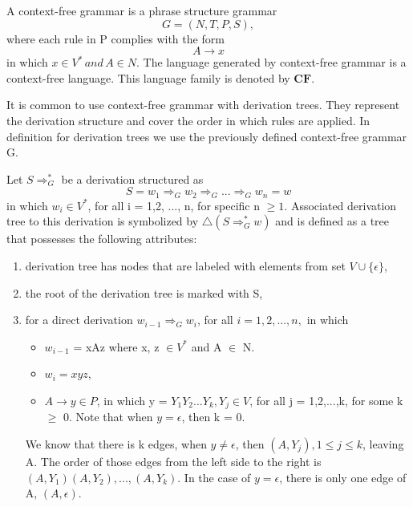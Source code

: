 \begin{definition}
\label{Def17}
A context-free grammar is a phrase structure grammar $$ G = (N, T, P, S),$$ where each rule in P complies with the form
$$A \rightarrow x$$ in which $x \in V^* \, and \, A \in N$. The language generated by context-free grammar is a context-free language. This language family is denoted by \(\mathbf{CF}\).
\end{definition}

It is common to use context-free grammar with derivation trees. They represent the derivation structure and cover the order in which rules are applied. In definition for derivation trees we use the previously defined context-free grammar G.

\begin{definition}
\label{derivtree}
Let $S \Rightarrow^*_G$ be a derivation structured as $$S = w_1 \Rightarrow_G w_2 \Rightarrow_G ... \Rightarrow_G w_n = w$$ in which $w_i \in V^*$, for all i = 1,2, ..., n, for specific n $\geq 1$. Associated derivation tree to this derivation is symbolized by $\triangle (S \Rightarrow^*_G w)$ and is defined as a tree that possesses the following attributes:

\begin{enumerate}
    \item derivation tree has nodes that are labeled with elements from set $ V \cup \{\epsilon\}$,
    \item the root of the derivation tree is marked with S,
    \item {for a direct derivation $w_{i-1} \Rightarrow_G w_i$, for all $i = 1,2, ..., n,$ in which
        \begin{itemize}
            \item{$w_{i-1}$ = xAz where x, z $\in V^*$ and A $\in$ N.}
            \item{$w_{i} = xyz$,}
            \item{$A \rightarrow y \in P$, in which y = $Y_1Y_2...Y_k, Y_j \in V$, for all j = 1,2,...,k, for some k $\geq$ 0. Note that when $y = \epsilon$, then k = 0.}
        \end{itemize}
    }
We know that there is k edges, when $y \neq \epsilon$, then $(A, Y_j), 1 \leq j \leq k$, leaving A. The order of those edges from the left side to the right is $(A, Y_1)(A, Y_2), ..., (A, Y_k)$. In the case of $y = \epsilon$, there is only one edge of A, $(A, \epsilon)$.
\end{enumerate}
\end{definition}

